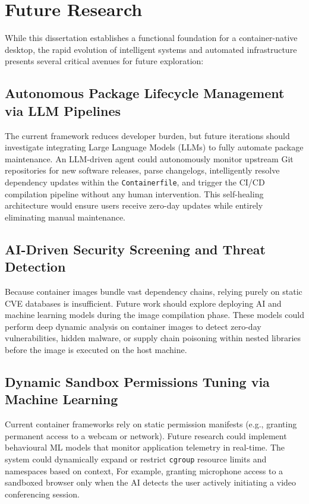 \documentclass[journal,onecolumn]{IEEEtran}
\newcommand{\code}[1]{\texttt{#1}}
\begin{document}
\newpage
\section{Future Research}
While this dissertation establishes a functional foundation for a container-native desktop, the rapid evolution of intelligent systems and automated infrastructure presents several critical avenues for future exploration:

\subsection{Autonomous Package Lifecycle Management via LLM Pipelines}
The current framework reduces developer burden, but future iterations should investigate integrating Large Language Models (LLMs) to fully automate package maintenance. An LLM-driven agent could autonomously monitor upstream Git repositories for new software releases, parse changelogs, intelligently resolve dependency updates within the \code{Containerfile}, and trigger the CI/CD compilation pipeline without any human intervention. This self-healing architecture would ensure users receive zero-day updates while entirely eliminating manual maintenance.

\subsection{AI-Driven Security Screening and Threat Detection}
Because container images bundle vast dependency chains, relying purely on static CVE databases is insufficient. Future work should explore deploying AI and machine learning models during the image compilation phase. These models could perform deep dynamic analysis on container images to detect zero-day vulnerabilities, hidden malware, or supply chain poisoning within nested libraries before the image is executed on the host machine.

\subsection{Dynamic Sandbox Permissions Tuning via Machine Learning}
Current container frameworks rely on static permission manifests (e.g., granting permanent access to a webcam or network). Future research could implement behavioural ML models that monitor application telemetry in real-time. The system could dynamically expand or restrict \code{cgroup} resource limits and namespaces based on context, For example, granting microphone access to a sandboxed browser only when the AI detects the user actively initiating a video conferencing session.
\end{document}
